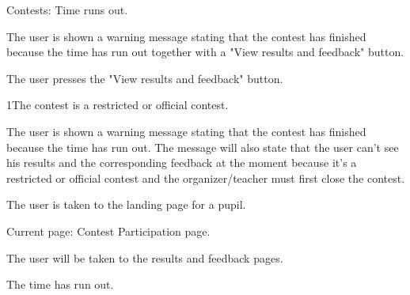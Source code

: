 \begin{uc}{Contests: Time runs out.}

    \begin{uc-mss}
    	\item The user is shown a warning message stating that the contest has finished because the time has run out together with a "View results and feedback" button.
	\item The user presses the "View results and feedback" button.
    \end{uc-mss}

    \begin{uc-ext}

        \begin{uc-fail}{1}{The contest is a restricted or official contest.}
        	\item The user is shown a warning message stating that the contest has finished because the time has run out. The message will also state that the user can't see his results and the corresponding feedback at the moment because it's a restricted or official contest and the organizer/teacher must first close the contest.
        	\item The user is taken to the landing page for a pupil. 
        \end{uc-fail}

    \end{uc-ext}

    \begin{uc-pre}
    \item Current page: Contest Participation page.
    \end{uc-pre}

    \begin{uc-post}
    \item The user will be taken to the results and feedback pages. 
    \end{uc-post}

    \begin{uc-trig}
    The time has run out. 
    \end{uc-trig}

\end{uc}
